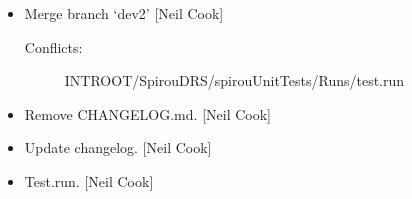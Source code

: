 \documentclass[a4paper,10pt,english]{report}
\begin{document}
\begin{itemize}
\item {} 
Merge branch ‘dev2’ {[}Neil Cook{]}
\begin{description}
\item[{Conflicts:}] \leavevmode
INTROOT/SpirouDRS/spirouUnitTests/Runs/test.run

\end{description}

\item {} 
Remove CHANGELOG.md. {[}Neil Cook{]}

\item {} 
Update changelog. {[}Neil Cook{]}

\item {} 
Test.run. {[}Neil Cook{]}

\end{itemize}
\end{document}
